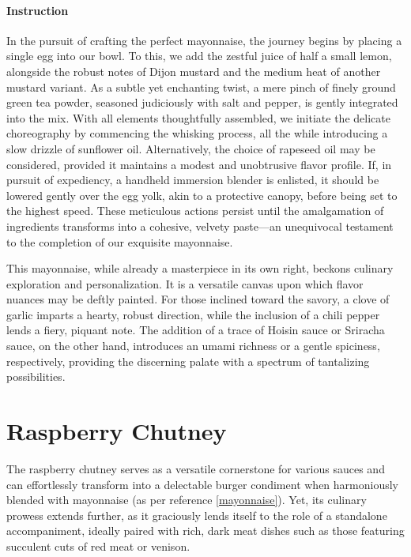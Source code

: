 \paragraph{Instruction}
In the pursuit of crafting the perfect mayonnaise, the journey begins by placing a single egg into our bowl. To this, we add the zestful juice of half a small lemon, alongside the robust notes of Dijon mustard and the medium heat of another mustard variant. As a subtle yet enchanting twist, a mere pinch of finely ground green tea powder, seasoned judiciously with salt and pepper, is gently integrated into the mix. With all elements thoughtfully assembled, we initiate the delicate choreography by commencing the whisking process, all the while introducing a slow drizzle of sunflower oil. Alternatively, the choice of rapeseed oil may be considered, provided it maintains a modest and unobtrusive flavor profile. If, in pursuit of expediency, a handheld immersion blender is enlisted, it should be lowered gently over the egg yolk, akin to a protective canopy, before being set to the highest speed. These meticulous actions persist until the amalgamation of ingredients transforms into a cohesive, velvety paste—an unequivocal testament to the completion of our exquisite mayonnaise.

This mayonnaise, while already a masterpiece in its own right, beckons culinary exploration and personalization. It is a versatile canvas upon which flavor nuances may be deftly painted. For those inclined toward the savory, a clove of garlic imparts a hearty, robust direction, while the inclusion of a chili pepper lends a fiery, piquant note. The addition of a trace of Hoisin sauce or Sriracha sauce, on the other hand, introduces an umami richness or a gentle spiciness, respectively, providing the discerning palate with a spectrum of tantalizing possibilities.
\clearpage

\section{Raspberry Chutney}
\label{raspberrychuttney}
The raspberry chutney serves as a versatile cornerstone for various sauces and can effortlessly transform into a delectable burger condiment when harmoniously blended with mayonnaise (as per reference \ref{mayonnaise}). Yet, its culinary prowess extends further, as it graciously lends itself to the role of a standalone accompaniment, ideally paired with rich, dark meat dishes such as those featuring succulent cuts of red meat or venison.


